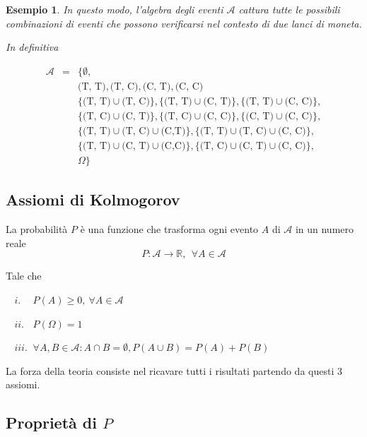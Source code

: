 \documentclass[
  11pt,
]{book}
\theoremstyle{mytheoremstyle}
\theoremstyle{mydefstyle}
\newtheorem{example}{{Esempio}}[section]
\begin{document}
\begin{example}
In questo modo, l'algebra degli eventi \(\mathscr{A}\) cattura tutte le possibili combinazioni di eventi che possono verificarsi nel contesto di due lanci di moneta.

In definitiva

\begin{eqnarray*}
\mathscr{A}   &=&  \{\emptyset, \\
              && \text{(T, T)}, \text{(T, C)}, \text{(C, T)}, \text{(C, C)} \\
              && \{\text{(T, T)}\cup \text{(T, C)}\}, \{\text{(T, T)}\cup \text{(C, T)}\} , \{\text{(T, T)}\cup \text{(C, C)}\},\\
              && \{\text{(T, C)}\cup \text{(C, T)}\}, \{\text{(T, C)}\cup \text{(C, C)}\} , \{\text{(C, T)}\cup \text{(C, C)}\},\\
              && \{\text{(T, T)}\cup \text{(T, C)}\cup\text{(C,T)}\}, \{\text{(T, T)}\cup \text{(T, C)}\cup \text{(C, C)}\},\\
              && \{\text{(T, T)}\cup \text{(C, T)}\cup\text{(C,C)}\}, \{\text{(T, C)}\cup \text{(C, T)}\cup \text{(C, C)}\},\\
              && \Omega\}
\end{eqnarray*}
\end{example}

\subsection{Assiomi di Kolmogorov}\label{assiomi-di-kolmogorov}

\begin{info}
La probabilità \(P\) è una funzione che trasforma ogni evento \(A\) di
\(\mathscr{A}\) in un numero reale
\[P:\mathscr{A}\to\mathbb{R},~~\forall A\in\mathscr{A}\]

Tale che

\(~~~~i.\phantom{i}\phantom{i}~\) \(P(A)\ge 0,~\forall A\in\mathscr{A}\)

\(~~~~ii.\phantom{i}~\) \(P(\Omega)=1\)

\(~~~~iii.~\)
\(\forall A,B\in\mathscr{A}:A\cap B=\emptyset, P(A\cup B)=P(A)+P(B)\)

\end{info}

La forza della teoria consiste nel ricavare tutti i risultati partendo
da questi 3 assiomi.

\subsection{\texorpdfstring{Proprietà di \(P\)}{Proprietà di P}}\label{proprietuxe0-di-p}
\end{document}
